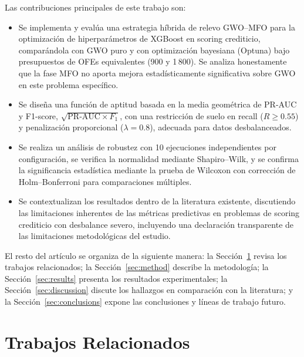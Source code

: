 \documentclass[journal]{IEEEtran}
\begin{document}
Las contribuciones principales de este trabajo son:
\begin{itemize}[leftmargin=*]
    \item Se implementa y evalúa una estrategia híbrida de relevo GWO--MFO para la optimización de hiperparámetros de XGBoost en scoring crediticio, comparándola con GWO puro y con optimización bayesiana (Optuna) bajo presupuestos de OFEs equivalentes (900 y 1\,800). Se analiza honestamente que la fase MFO no aporta mejora estadísticamente significativa sobre GWO en este problema específico.
    \item Se diseña una función de aptitud basada en la media geométrica de PR-AUC y F1-score, $\sqrt{\text{PR-AUC} \times F_1}$, con una restricción de suelo en recall ($R \geq 0.55$) y penalización proporcional ($\lambda = 0.8$), adecuada para datos desbalanceados.
    \item Se realiza un análisis de robustez con 10 ejecuciones independientes por configuración, se verifica la normalidad mediante Shapiro--Wilk, y se confirma la significancia estadística mediante la prueba de Wilcoxon con corrección de Holm--Bonferroni para comparaciones múltiples.
    \item Se contextualizan los resultados dentro de la literatura existente, discutiendo las limitaciones inherentes de las métricas predictivas en problemas de scoring crediticio con desbalance severo, incluyendo una declaración transparente de las limitaciones metodológicas del estudio.
\end{itemize}

El resto del artículo se organiza de la siguiente manera: la Sección~\ref{sec:related} revisa los trabajos relacionados; la Sección~\ref{sec:method} describe la metodología; la Sección~\ref{sec:results} presenta los resultados experimentales; la Sección~\ref{sec:discussion} discute los hallazgos en comparación con la literatura; y la Sección~\ref{sec:conclusions} expone las conclusiones y líneas de trabajo futuro.

\section{Trabajos Relacionados}
\label{sec:related}
\end{document}
